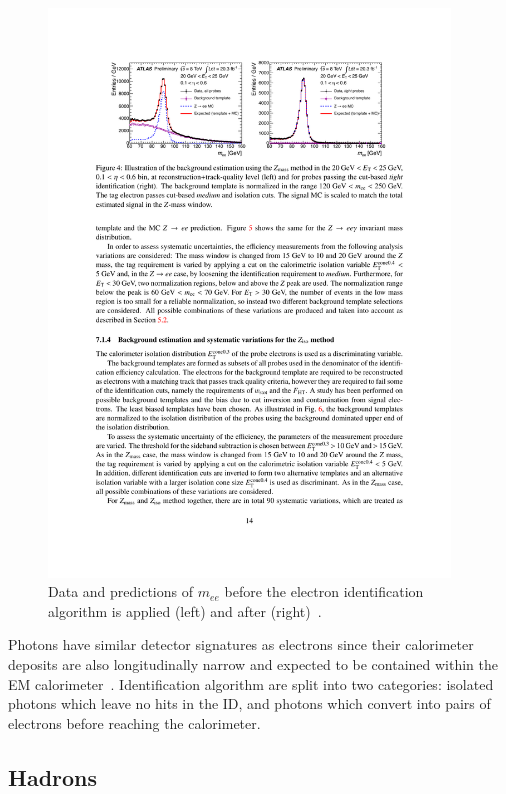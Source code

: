 \begin{figure}[tp]
  \centering
  \includegraphics[width=0.95\textwidth]{figures/performance/electron-ZeeTP}
  \caption{Data and predictions of $m_{ee}$ before the electron identification algorithm is applied (left) and after (right)~\cite{ATLAS-CONF-2014-032}.}
  \label{fig:objects-electron-id}
\end{figure}

Photons have similar detector signatures as electrons since their calorimeter deposits are also longitudinally narrow and expected to be contained within the EM calorimeter~\cite{ATLAS-CONF-2012-123}. Identification algorithm are split into two categories: isolated photons which leave no hits in the ID, and photons which convert into pairs of electrons before reaching the calorimeter.

\subsection{Hadrons}
\label{sec:hadrons}


